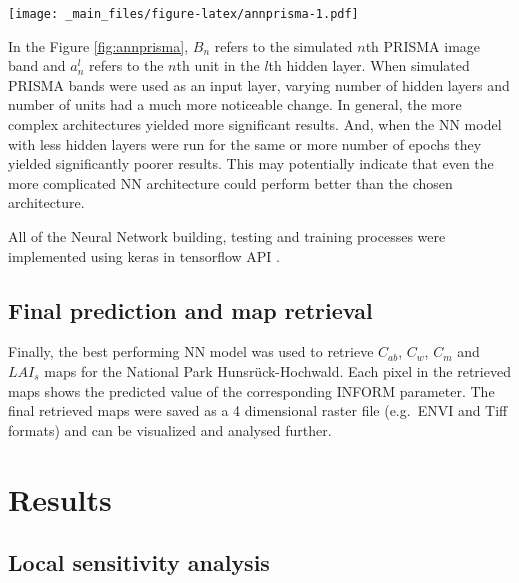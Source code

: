 \documentclass[a4paper, twoside]{templates/ociamthesis}
\let\origfigure\figure
\let\endorigfigure\endfigure
\renewenvironment{figure}[1][2] {
    \expandafter\origfigure\expandafter[H]
} {
    \endorigfigure
}
\begin{document}
\begin{figure}
\centering
\texttt{[image: \_main\_files/figure-latex/annprisma-1.pdf]}
\caption{\label{fig:annprisma}Architecture of the Neural Network with simulated PRISMA image bands as inputs}
\end{figure}

In the Figure \ref{fig:annprisma}, \(B_{n}\) refers to the simulated \(n\)th PRISMA image band and \(a_{n}^{l}\) refers to the \(n\)th unit in the \(l\)th hidden layer. When simulated PRISMA bands were used as an input layer, varying number of hidden layers and number of units had a much more noticeable change. In general, the more complex architectures yielded more significant results. And, when the NN model with less hidden layers were run for the same or more number of epochs they yielded significantly poorer results. This may potentially indicate that even the more complicated NN architecture could perform better than the chosen architecture.

All of the Neural Network building, testing and training processes were implemented using keras \citep{keras} in tensorflow API \citep{tensorflow}.

\hypertarget{final-prediction-and-map-retrieval}{%
\section{Final prediction and map retrieval}\label{final-prediction-and-map-retrieval}}

Finally, the best performing NN model was used to retrieve \(C_{ab}\), \(C_{w}\), \(C_{m}\) and \(LAI_{s}\) maps for the National Park Hunsrück-Hochwald. Each pixel in the retrieved maps shows the predicted value of the corresponding INFORM parameter. The final retrieved maps were saved as a 4 dimensional raster file (e.g.~ENVI and Tiff formats) and can be visualized and analysed further.

\hypertarget{results}{%
\chapter{Results}\label{results}}

\hypertarget{local-sensitivity-analysis-1}{%
\section{Local sensitivity analysis}\label{local-sensitivity-analysis-1}}
\end{document}
